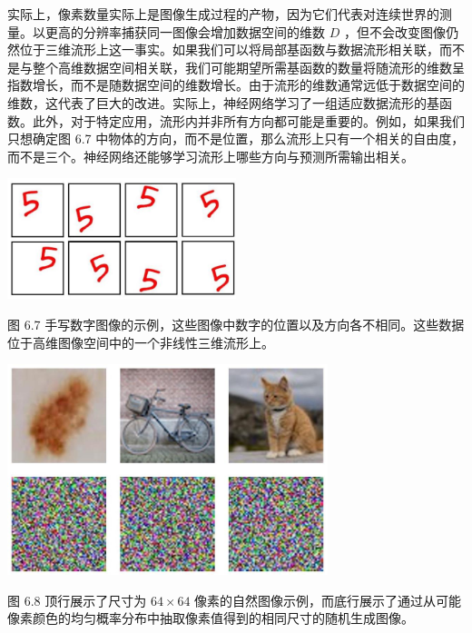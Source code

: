 \documentclass[10pt]{article}
\begin{document}
实际上，像素数量实际上是图像生成过程的产物，因为它们代表对连续世界的测量。以更高的分辨率捕获同一图像会增加数据空间的维数 \(D\) ，但不会改变图像仍然位于三维流形上这一事实。如果我们可以将局部基函数与数据流形相关联，而不是与整个高维数据空间相关联，我们可能期望所需基函数的数量将随流形的维数呈指数增长，而不是随数据空间的维数增长。由于流形的维数通常远低于数据空间的维数，这代表了巨大的改进。实际上，神经网络学习了一组适应数据流形的基函数。此外，对于特定应用，流形内并非所有方向都可能是重要的。例如，如果我们只想确定图 6.7 中物体的方向，而不是位置，那么流形上只有一个相关的自由度，而不是三个。神经网络还能够学习流形上哪些方向与预测所需输出相关。

\begin{center}
\includegraphics[max width=0.5\textwidth]{images/0194e279-9b28-703a-88f4-c3ac21e2010d_196_911_1676_638_337_0.jpg}
\end{center}
\hspace*{3em} 

图 6.7 手写数字图像的示例，这些图像中数字的位置以及方向各不相同。这些数据位于高维图像空间中的一个非线性三维流形上。

\begin{center}
\includegraphics[max width=0.7\textwidth]{images/0194e279-9b28-703a-88f4-c3ac21e2010d_197_549_356_920_605_0.jpg}
\end{center}
\hspace*{3em} 

图 6.8 顶行展示了尺寸为 \({64} \times  {64}\) 像素的自然图像示例，而底行展示了通过从可能像素颜色的均匀概率分布中抽取像素值得到的相同尺寸的随机生成图像。
\end{document}
